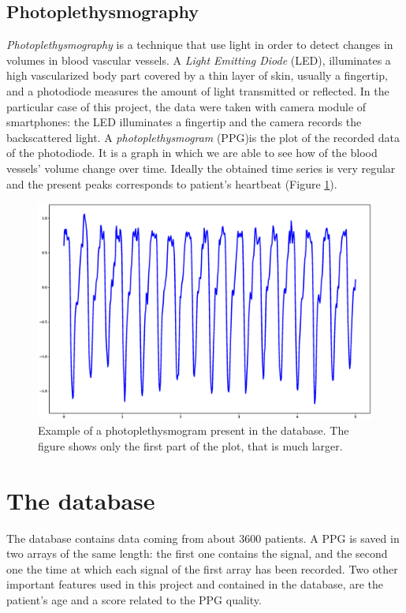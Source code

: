 \documentclass[12pt,a4paper,twocolumn]{article}
\begin{document}
	\subsection{Photoplethysmography}
		\label{ppg_intro}
		\emph{Photoplethysmography} is a technique that use light in order to detect changes in volumes in blood vascular vessels. A \emph{Light Emitting Diode} (LED), illuminates a high vascularized body part covered by a thin layer of skin, usually a fingertip, and a photodiode measures the amount of light transmitted or reflected. In the particular case of this project, the data were taken with camera module of smartphones: the LED illuminates a fingertip and the camera records the backscattered light. 
		A \emph{photoplethysmogram} (PPG)is the plot of the recorded data of the photodiode. It is a graph in which we are able to see how  of the blood vessels' volume change over time. Ideally the obtained time series is very regular and the present peaks corresponds to patient's  heartbeat (Figure \ref{fig:ppgexample}).
		\begin{figure}[h!]
			\centering
			\includegraphics[width=1\linewidth]{images/ppg_example2}
			\caption{Example of a photoplethysmogram present in the database. The figure shows only the first part of the plot, that is much larger.}
			\label{fig:ppgexample}
		\end{figure}
		
		
		\section{The database}
			The database contains data coming from about 3600 patients. A PPG is saved in two arrays of the same length: the first one contains the signal, and the second one the time at which each signal of the first array has been recorded.  Two other important features used in this project and contained in the database, are the patient's age and a score related to the PPG quality.
			
\end{document}
